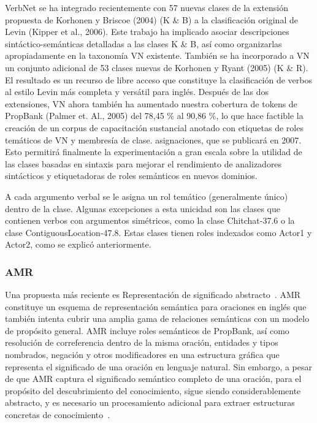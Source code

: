 VerbNet se ha integrado recientemente con 57 nuevas clases de la extensión propuesta de Korhonen y Briscoe (2004) (K \& B) a la clasificación original de Levin (Kipper et al., 2006). Este trabajo ha implicado asociar descripciones sintáctico-semánticas detalladas a las clases K \& B, así como organizarlas apropiadamente en la taxonomía VN existente. También se ha incorporado a VN un conjunto adicional de 53 clases nuevas de Korhonen y Ryant (2005) (K \& R). El resultado es un recurso de libre acceso que constituye la clasificación de verbos al estilo Levin más completa y versátil para inglés. Después de las dos extensiones, VN ahora también ha aumentado nuestra cobertura de tokens de PropBank (Palmer et. Al., 2005) del 78,45 \% al 90,86 \%, lo que hace factible la creación de un corpus de capacitación sustancial anotado con etiquetas de roles temáticos de VN y membresía de clase. asignaciones, que se publicará en 2007. Esto permitirá finalmente la experimentación a gran escala sobre la utilidad de las clases basadas en sintaxis para mejorar el rendimiento de analizadores sintácticos y etiquetadoras de roles semánticos en nuevos dominios.

A cada argumento verbal se le asigna un rol temático (generalmente único) dentro de la clase. Algunas excepciones a esta unicidad son las clases que contienen verbos con argumentos simétricos, como la clase Chitchat-37.6 o la clase ContiguousLocation-47.8. Estas clases tienen roles indexados como Actor1 y Actor2, como se explicó anteriormente.

\subsubsection*{AMR}

Una propuesta más reciente es Representación de significado abstracto~\cite[ARM]{amr}. AMR constituye un esquema de representación semántica para oraciones en inglés que también intenta cubrir una amplia gama de relaciones semánticas con un modelo de propósito general.
AMR incluye roles semánticos de PropBank, así como resolución de correferencia dentro de la misma oración, entidades y tipos nombrados, negación y otros modificadores en una estructura gráfica que representa el significado de una oración en lenguaje natural.
Sin embargo, a pesar de que AMR captura el significado semántico completo de una oración, para el propósito del descubrimiento del conocimiento, sigue siendo considerablemente abstracto, y es necesario un procesamiento adicional para extraer estructuras concretas de conocimiento~\cite{rao2017biomedical}.

